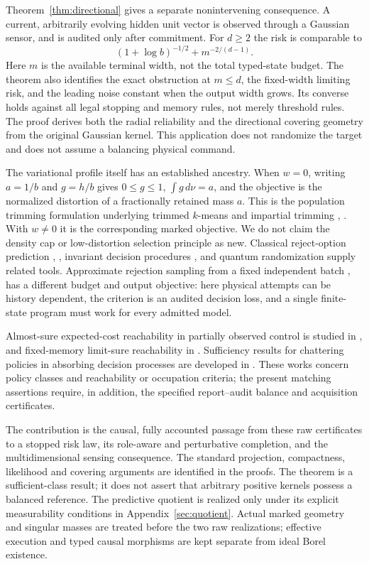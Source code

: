 Theorem~\ref{thm:directional} gives a separate nonintervening consequence. A current, arbitrarily evolving hidden unit vector is observed through a Gaussian sensor, and is audited only after commitment. For $d\ge2$ the risk is comparable to
\[
 (1+\log b)^{-1/2}+m^{-2/(d-1)}.
\]
Here $m$ is the available terminal width, not the total typed-state budget. The theorem also identifies the exact obstruction at $m\le d$, the fixed-width limiting risk, and the leading noise constant when the output width grows. Its converse holds against all legal stopping and memory rules, not merely threshold rules. The proof derives both the radial reliability and the directional covering geometry from the original Gaussian kernel. This application does not randomize the target and does not assume a balancing physical command.

The variational profile itself has an established ancestry. When $w=0$, writing $a=1/b$ and $g=h/b$ gives $0\le g\le1$, $\int g\,d\nu=a$, and the objective is the normalized distortion of a fractionally retained mass $a$. This is the population trimming formulation underlying trimmed $k$-means and impartial trimming \cite{CGM97}, \cite{GG99}. With $w\ne0$ it is the corresponding marked objective. We do not claim the density cap or low-distortion selection principle as new. Classical reject-option prediction \cite{Chow}, \cite{DHZ}, invariant decision procedures \cite{Luschgy}, and quantum randomization \cite{AMTW} supply related tools. Approximate rejection sampling from a fixed independent batch \cite{BP23}, \cite{SPJ26} has a different budget and output objective: here physical attempts can be history dependent, the criterion is an audited decision loss, and a single finite-state program must work for every admitted model.

Almost-sure expected-cost reachability in partially observed control is studied in \cite{CCGK}, and fixed-memory limit-sure reachability in \cite{ACSS}. Sufficiency results for chattering policies in absorbing decision processes are developed in \cite{DPChatter}. These works concern policy classes and reachability or occupation criteria; the present matching assertions require, in addition, the specified report--audit balance and acquisition certificates.

The contribution is the causal, fully accounted passage from these raw certificates to a stopped risk law, its role-aware and perturbative completion, and the multidimensional sensing consequence. The standard projection, compactness, likelihood and covering arguments are identified in the proofs. The theorem is a sufficient-class result; it does not assert that arbitrary positive kernels possess a balanced reference. The predictive quotient is realized only under its explicit measurability conditions in Appendix~\ref{sec:quotient}. Actual marked geometry and singular masses are treated before the two raw realizations; effective execution and typed causal morphisms are kept separate from ideal Borel existence.
